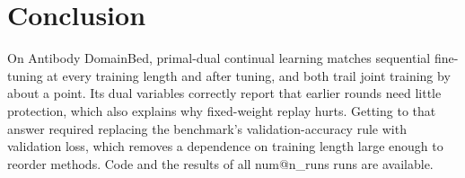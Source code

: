 \documentclass[10pt]{article}
\makeatletter
\newcommand{\num}[1]{\csname num@#1\endcsname}
\makeatother
\begin{document}
\section{Conclusion}

On Antibody DomainBed, primal-dual continual learning matches sequential fine-tuning at every training length and after tuning, and both trail joint training by about a point. Its dual variables correctly report that earlier rounds need little protection, which also explains why fixed-weight replay hurts. Getting to that answer required replacing the benchmark's validation-accuracy rule with validation loss, which removes a dependence on training length large enough to reorder methods. Code and the results of all \num{n_runs} runs are available.



\end{document}

